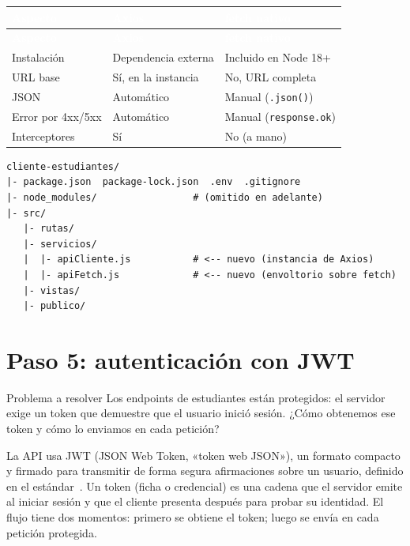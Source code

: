 \documentclass[11pt]{article}
\begin{document}
{\renewcommand{\arraystretch}{1.25}
\begin{longtable}{>{\raggedright\arraybackslash}p{4.3cm} >{\raggedright\arraybackslash}p{5.4cm} >{\raggedright\arraybackslash}p{5.4cm}}
\rowcolor{ndverde}\textcolor{white}{\textbf{Aspecto}} & \textcolor{white}{\textbf{Axios}} & \textcolor{white}{\textbf{fetch nativo}} \\
\endfirsthead
\rowcolor{ndverde}\textcolor{white}{\textbf{Aspecto}} & \textcolor{white}{\textbf{Axios}} & \textcolor{white}{\textbf{fetch nativo}} \\
\endhead
Instalación & Dependencia externa & Incluido en Node 18+ \\ \hline
URL base & Sí, en la instancia & No, URL completa \\ \hline
JSON & Automático & Manual (\texttt{.json()}) \\ \hline
Error por 4xx/5xx & Automático & Manual (\texttt{response.ok}) \\ \hline
Interceptores & Sí & No (a mano) \\ \hline
\end{longtable}}

\begin{cajacodigo}
\begin{lstlisting}[style=markup]
cliente-estudiantes/
|- package.json  package-lock.json  .env  .gitignore
|- node_modules/                 # (omitido en adelante)
|- src/
   |- rutas/
   |- servicios/
   |  |- apiCliente.js           # <-- nuevo (instancia de Axios)
   |  |- apiFetch.js             # <-- nuevo (envoltorio sobre fetch)
   |- vistas/
   |- publico/
\end{lstlisting}
\end{cajacodigo}
\vspace{2pt}

\section{Paso 5: autenticación con JWT}
\begin{cajaproblema}{Problema a resolver}
Los endpoints de estudiantes están protegidos: el servidor exige un token que demuestre que el usuario inició sesión. ¿Cómo obtenemos ese token y cómo lo enviamos en cada petición?\par
\end{cajaproblema}
La API usa JWT (JSON Web Token, «token web JSON»), un formato compacto y firmado para transmitir de forma segura afirmaciones sobre un usuario, definido en el estándar~\citep{jones2015jwt}. Un token (ficha o credencial) es una cadena que el servidor emite al iniciar sesión y que el cliente presenta después para probar su identidad. El flujo tiene dos momentos: primero se obtiene el token; luego se envía en cada petición protegida.
\end{document}
